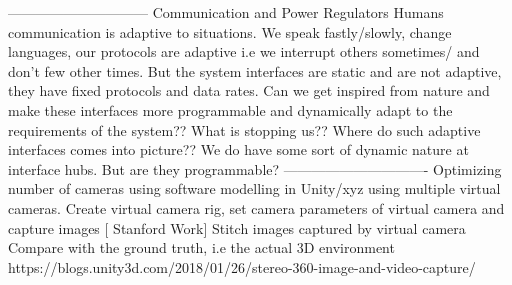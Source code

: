 ------------------------------
Communication and Power Regulators
Humans communication is adaptive to situations. We speak fastly/slowly, change languages, our protocols are adaptive i.e we interrupt others sometimes/ and don’t few other times. But the system interfaces are static and are not adaptive, they have fixed protocols and data rates. Can we get inspired from nature and make these interfaces more programmable and dynamically adapt to the requirements of the system?? What is stopping us?? 
Where do such adaptive interfaces comes into picture?? We do have some sort of dynamic nature at interface hubs. But are they programmable?
-------------------------------
Optimizing number of cameras using software modelling in Unity/xyz using multiple virtual cameras. 
Create virtual camera rig, set camera parameters of virtual camera and capture images [ Stanford Work]
Stitch images captured by virtual camera 
Compare with the ground truth, i.e the actual 3D environment 
https://blogs.unity3d.com/2018/01/26/stereo-360-image-and-video-capture/

